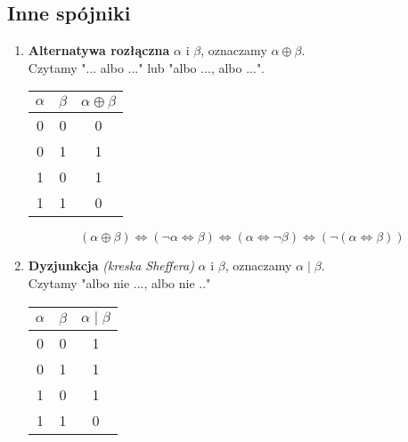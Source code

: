 \documentclass[a5paper,8pt]{article}
\theoremstyle{mythmstyle}
\begin{document}
        \subsection{Inne spójniki} %
        \label{sub:inne_spójniki}
            \begin{enumerate}
                \item \textbf{Alternatywa rozłączna} $\alpha$ i $\beta$, oznaczamy $\alpha \oplus \beta$.\\
                Czytamy "... albo ..." lub "albo ..., albo ...".\\

                \begin{center}
                    \begin{tabular}{|c|c|c|}
                      \hline 
                      $\alpha$ & $\beta$ & $\alpha \oplus \beta$\\
                      \hline
                      0 & 0 & 0\\
                      \hline
                      0 & 1 & 1\\
                      \hline
                      1 & 0 & 1\\
                      \hline
                      1 & 1 & 0\\
                      \hline
                    \end{tabular}
                \end{center}

                \begin{equation*}
                    (\alpha \oplus \beta) \iff (\neg \alpha \iff \beta) \iff (\alpha \iff \neg \beta) \iff (\neg (\alpha \iff \beta))
                \end{equation*}


                \item \textbf{Dyzjunkcja} \textit{(kreska Sheffera)} $\alpha$ i $\beta$, oznaczamy $\alpha \mid \beta$.\\
                Czytamy "albo nie ..., albo nie .."\\

                \begin{center}
                    \begin{tabular}{|c|c|c|}
                      \hline 
                      $\alpha$ & $\beta$ & $\alpha \mid \beta$\\
                      \hline
                      0 & 0 & 1\\
                      \hline
                      0 & 1 & 1\\
                      \hline
                      1 & 0 & 1\\
                      \hline
                      1 & 1 & 0\\
                      \hline
                    \end{tabular}
                \end{center}


\end{enumerate}
\end{document}
